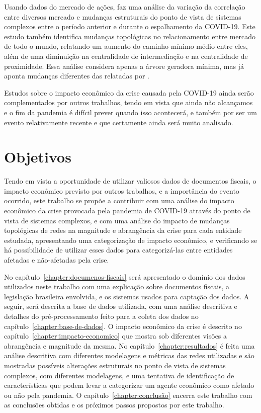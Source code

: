 Usando dados do mercado de ações,  faz uma análise da variação da correlação entre diversos mercado e mudanças estruturais do ponto de vista de sistemas complexos entre o período anterior e durante o espalhamento da COVID-19. Este estudo também identifica mudanças topológicas no relacionamento entre mercado de todo o mundo, relatando um aumento do caminho mínimo médio entre eles, além de uma diminuição na centralidade de intermediação e na centralidade de proximidade. Essa análise considera apenas a árvore geradora mínima, mas já aponta mudanças diferentes das relatadas por .

Estudos sobre o impacto econômico da crise causada pela COVID-19 ainda serão complementados por outros trabalhos, tendo em vista que ainda não alcançamos e o fim da pandemia é difícil prever quando isso acontecerá, e também por ser um evento relativamente recente e que certamente ainda será muito analisado.

\section{Objetivos}
\label{introducao:objetivos}

Tendo em vista a oportunidade de utilizar valiosos dados de documentos fiscais, o impacto econômico previsto por outros trabalhos, e a importância do evento ocorrido, este trabalho se propõe a contribuir com uma análise do impacto econômico da crise provocada pela pandemia de COVID-19 através do ponto de vista de sistemas complexos, e com uma análise do impacto de mudanças topológicas de redes na magnitude e abrangência da crise para cada entidade estudada, apresentando uma categorização de impacto econômico, e verificando se há possibilidade de utilizar esses dados para categorizá-las entre entidades afetadas e não-afetadas pela crise.

No capítulo~\ref{chapter:documenos-fiscais} será apresentado o domínio dos dados utilizados neste trabalho com uma explicação sobre documentos fiscais, a legislação brasileira envolvida, e os sistemas usados para captação dos dados. A seguir, será descrita a base de dados utilizada, com uma análise descritiva e detalhes do pré-processamento feito para a coleta dos dados no capítulo~\ref{chapter:base-de-dados}. O impacto econômico da crise é descrito no capítulo~\ref{chapter:impacto-economico} que mostra sob diferentes visões a abrangência e magnitude da mesma. No capítulo~\ref{chapter:resultados} é feita uma análise descritiva com diferentes modelagens e métricas das redes utilizadas e são mostradas possíveis alterações estruturais no ponto de vista de sistemas complexos, com diferentes modelagens, e uma tentativa de identificação de características que podem levar a categorizar um agente econômico como afetado ou não pela pandemia. O capítulo~\ref{chapter:conclusão} encerra este trabalho com as conclusões obtidas e os próximos passos propostos por este trabalho.
